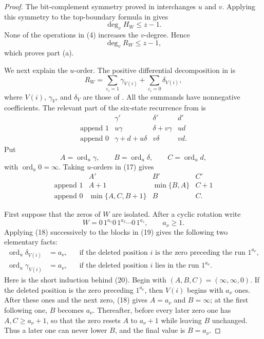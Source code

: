 \documentclass[11pt]{article}
\newcommand{\ord}{\operatorname{ord}}
\begin{document}
\begin{proof}
The bit-complement symmetry proved in \cite[proof of Theorem 5.2]{Proof}
interchanges $u$ and $v$.  Applying this symmetry to the top-boundary
formula in \cite[Theorem 8.3, equation (43)]{Proof} gives
\[
                         \deg_v H_W\leq z-1.
\]
None of the operations in (4) increases the $v$-degree.  Hence
\[
                         \deg_v R_W\leq z-1,                 \tag{15}
\]
which proves part (a).

We next explain the $u$-order.  The positive differential decomposition in
\cite[Theorem 5.1, equation (27)]{Proof} is
\[
 R_W=\sum_{\varepsilon_i=1}\gamma_{V(i)}
          +\sum_{\varepsilon_i=0}\delta_{V(i)},              \tag{16}
\]
where $V(i)$, $\gamma_V$, and $\delta_V$ are those of
\cite[Sections 2 and 5]{Proof}.  All the summands have nonnegative
coefficients.  The relevant part
of the six-state recurrence from \cite[Theorem 2.2, equations (6)--(7)]{Proof}
is
\[
\begin{array}{c|ccc}
 &\gamma'&\delta'&d'\\ \hline
 \text{append }1&u\gamma&\delta+v\gamma&ud\\
 \text{append }0&\gamma+d+u\delta&v\delta&vd.
\end{array}                                                   \tag{17}
\]
Put
\[
 A=\ord_u\gamma,\qquad B=\ord_u\delta,
 \qquad C=\ord_ud,
\]
with $\ord_u0=\infty$.  Taking $u$-orders in (17) gives
\[
\begin{array}{c|ccc}
 &A'&B'&C'\\ \hline
 \text{append }1&A+1&\min\{B,A\}&C+1\\
 \text{append }0&\min\{A,C,B+1\}&B&C.
\end{array}                                                   \tag{18}
\]

First suppose that the zeros of $W$ are isolated.  After a cyclic
rotation write
\[
              W=0\,1^{a_1}0\,1^{a_2}\cdots0\,1^{a_z},
              \qquad a_\nu\geq1.                             \tag{19}
\]
Applying (18) successively to the blocks in (19) gives the following
two elementary facts:
\[
\begin{aligned}
 \ord_u\delta_{V(i)}&=a_\nu,
   &&\text{if the deleted position $i$ is the zero preceding
             the run $1^{a_\nu}$},\\
 \ord_u\gamma_{V(i)}&=a_\nu,
   &&\text{if the deleted position $i$ lies in the run
             $1^{a_\nu}$}.
\end{aligned}                                                 \tag{20}
\]
Here is the short induction behind (20).  Begin with
$(A,B,C)=(\infty,\infty,0)$.  If the deleted position is the zero
preceding $1^{a_\nu}$, then $V(i)$ begins with $a_\nu$ ones.  After
these ones and the next zero, (18) gives $A=a_\nu$ and $B=\infty$;
at the first following one, $B$ becomes $a_\nu$.  Thereafter, before
every later zero one has $A,C\geq a_\nu+1$, so that the zero resets
$A$ to $a_\nu+1$ while leaving $B$ unchanged.  Thus a later one can
never lower $B$, and the final value is $B=a_\nu$.


\end{proof}
\end{document}
